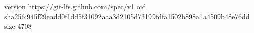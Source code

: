version https://git-lfs.github.com/spec/v1
oid sha256:945f29eadd0f1dd5f31092aaa3d2105d73199fdfa1502b898a1a4509b48e76dd
size 4708
